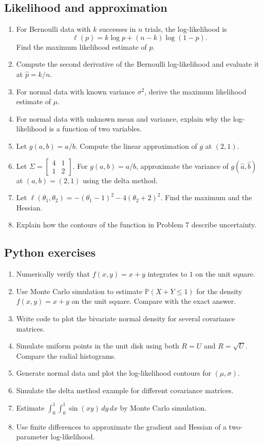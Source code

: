 \documentclass[11pt,oneside]{book}
\newcommand{\Prob}{\mathbb P}
\newcommand{\dd}{\,d}
\begin{document}
\subsection*{Likelihood and approximation}
\begin{enumerate}
  \item For Bernoulli data with $k$ successes in $n$ trials, the log-likelihood is
  \[
  \ell(p)=k\log p+(n-k)\log(1-p).
  \]
  Find the maximum likelihood estimate of $p$.
  \item Compute the second derivative of the Bernoulli log-likelihood and evaluate it at $\hat p=k/n$.
  \item For normal data with known variance $\sigma^2$, derive the maximum likelihood estimate of $\mu$.
  \item For normal data with unknown mean and variance, explain why the log-likelihood is a function of two variables.
  \item Let $g(a,b)=a/b$. Compute the linear approximation of $g$ at $(2,1)$.
  \item Let $\Sigma=\begin{bmatrix}4&1\\1&2\end{bmatrix}$. For $g(a,b)=a/b$, approximate the variance of $g(\hat a,\hat b)$ at $(a,b)=(2,1)$ using the delta method.
  \item Let $\ell(\theta_1,\theta_2)=-(\theta_1-1)^2-4(\theta_2+2)^2$. Find the maximum and the Hessian.
  \item Explain how the contours of the function in Problem 7 describe uncertainty.
\end{enumerate}

\subsection*{Python exercises}
\begin{enumerate}
  \item Numerically verify that $f(x,y)=x+y$ integrates to $1$ on the unit square.
  \item Use Monte Carlo simulation to estimate $\Prob(X+Y\le 1)$ for the density $f(x,y)=x+y$ on the unit square. Compare with the exact answer.
  \item Write code to plot the bivariate normal density for several covariance matrices.
  \item Simulate uniform points in the unit disk using both $R=U$ and $R=\sqrt U$. Compare the radial histograms.
  \item Generate normal data and plot the log-likelihood contours for $(\mu,\sigma)$.
  \item Simulate the delta method example for different covariance matrices.
  \item Estimate $\int_0^1\int_0^1\sin(xy)\dd y\dd x$ by Monte Carlo simulation.
  \item Use finite differences to approximate the gradient and Hessian of a two-parameter log-likelihood.
\end{enumerate}
\end{document}
